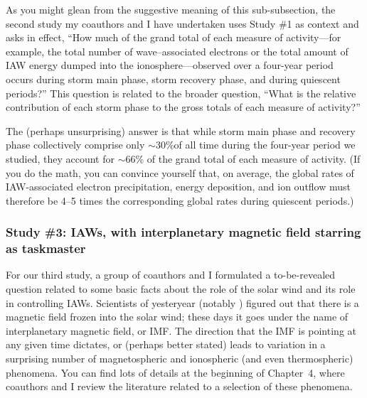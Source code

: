 As you might glean from the suggestive meaning of this sub-subsection, the
second study my coauthors and I have undertaken uses Study \#1 as context and
asks in effect, ``How much of the grand total of each measure of \Alfic
activity---for example, the total number of \Alf wave--associated electrons or
the total amount of IAW energy dumped into the ionosphere---observed over a
four-year period occurs during storm main phase, storm recovery phase, and
during quiescent periods?'' This question is related to the broader question,
``What is the relative contribution of each storm phase to the gross totals of
each measure of \Alfic activity?''

The (perhaps unsurprising) answer is that while storm main phase and recovery
phase collectively comprise only $\sim$30\%of all time during the four-year
period we studied, they account for $\sim$66\% of the grand total of each
measure of \Alfic activity. (If you do the math, you can convince yourself that,
on average, the global rates of IAW-associated electron precipitation, energy
deposition, and ion outflow must therefore be 4--5 times the corresponding
global rates during quiescent periods.)

\subsubsection{Study \#3: IAWs, with interplanetary magnetic field starring as taskmaster}

For our third study, a group of coauthors and I formulated a to-be-revealed
question related to some basic facts about the role of the solar wind and its
role in controlling IAWs. Scientists of yesteryear (notably \citet{Parker1958})
figured out that there is a magnetic field frozen into the solar wind; these
days it goes under the name of interplanetary magnetic field, or IMF. The
direction that the IMF is pointing at any given time dictates, or (perhaps
better stated) leads to variation in a surprising number of magnetospheric and
ionospheric (and even thermospheric) phenomena. You can find lots of details at
the beginning of Chapter~4, where coauthors and I review the literature related
to a selection of these phenomena.

